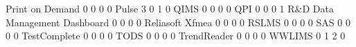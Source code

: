 \documentclass{article}
\begin{document}
\begin{Schunk}
\begin{Soutput}
  Print on Demand                                            0    0   0   0
  Pulse                                                      3    0   1   0
  QIMS                                                       0    0   0   0
  QPI                                                        0    0   0   1
  R&D Data Management Dashboard                              0    0   0   0
  Reliasoft Xfmea                                            0    0   0   0
  RSLMS                                                      0    0   0   0
  SAS                                                        0    0   0   0
  TestComplete                                               0    0   0   0
  TODS                                                       0    0   0   0
  TrendReader                                                0    0   0   0
  WWLIMS                                                     0    1   2   0
                                          

\end{Soutput}
\end{Schunk}
\end{document}

